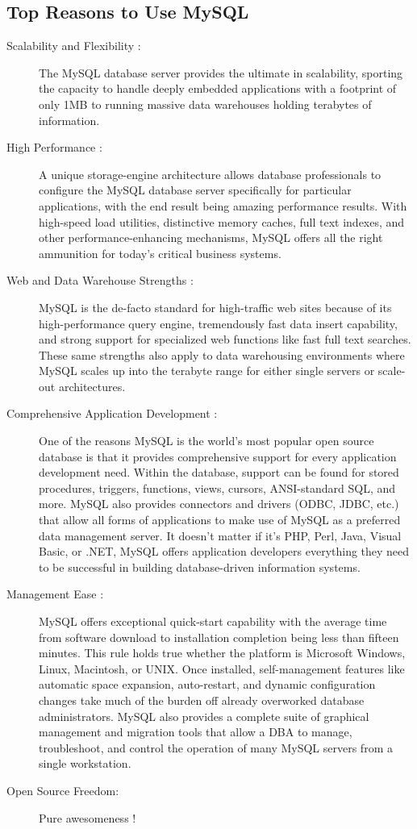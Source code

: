 \subsection{Top Reasons to Use MySQL}

\begin{description}
\item[Scalability and Flexibility :] 
The MySQL database server provides the ultimate in scalability, sporting the capacity to handle deeply embedded applications with a footprint of only 1MB to running massive data warehouses holding terabytes of information.

\item[High Performance :]
A unique storage-engine architecture allows database professionals to configure the MySQL database server specifically for particular applications, with the end result being amazing performance results. With high-speed load utilities, distinctive memory caches, full text indexes, and other performance-enhancing mechanisms, MySQL offers all the right ammunition for today's critical business systems.

\item[Web and Data Warehouse Strengths :]
MySQL is the de-facto standard for high-traffic web sites because of its high-performance query engine, tremendously fast data insert capability, and strong support for specialized web functions like fast full text searches. These same strengths also apply to data warehousing environments where MySQL scales up into the terabyte range for either single servers or scale-out architectures.

\item[Comprehensive Application Development :]
One of the reasons MySQL is the world's most popular open source database is that it provides comprehensive support for every application development need. Within the database, support can be found for stored procedures, triggers, functions, views, cursors, ANSI-standard SQL, and more. MySQL also provides connectors and drivers (ODBC, JDBC, etc.) that allow all forms of applications to make use of MySQL as a preferred data management server. It doesn't matter if it's PHP, Perl, Java, Visual Basic, or .NET, MySQL offers application developers everything they need to be successful in building database-driven information systems.

\item[Management Ease :]
MySQL offers exceptional quick-start capability with the average time from software download to installation completion being less than fifteen minutes. This rule holds true whether the platform is Microsoft Windows, Linux, Macintosh, or UNIX. Once installed, self-management features like automatic space expansion, auto-restart, and dynamic configuration changes take much of the burden off already overworked database administrators. MySQL also provides a complete suite of graphical management and migration tools that allow a DBA to manage, troubleshoot, and control the operation of many MySQL servers from a single workstation.

\item[Open Source Freedom:]
Pure awesomeness !
\end{description}
